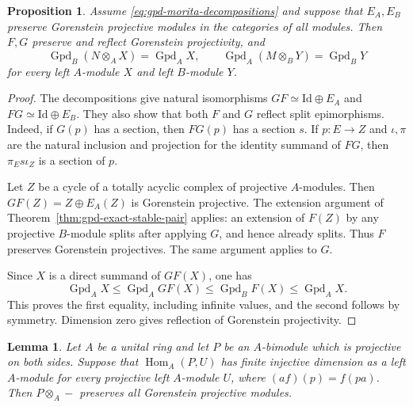 \documentclass[12pt,a4paper,english,reqno]{amsart}
\numberwithin{equation}{section}
\theoremstyle{plain}
\newtheorem{proposition}[theorem]{Proposition}
\newtheorem{lemma}[theorem]{Lemma}
\theoremstyle{definition}
\begin{document}
\begin{proposition}
\label{prop:gpd-error-functor-criterion}
Assume \eqref{eq:gpd-morita-decompositions} and suppose that $E_A,E_B$
preserve Gorenstein projective modules in the categories of all
modules.  Then $F,G$ preserve and reflect Gorenstein projectivity, and
\begin{equation}
 \operatorname{Gpd}_B(N\otimes_AX)=\operatorname{Gpd}_A X,\qquad
 \operatorname{Gpd}_A(M\otimes_BY)=\operatorname{Gpd}_B Y
 \label{eq:gpd-bimodule-equalities}
\end{equation}
for every left $A$-module $X$ and left $B$-module $Y$.
\end{proposition}

\begin{proof}
The decompositions give natural isomorphisms
$GF\simeq\mathrm{Id}\oplus E_A$ and
$FG\simeq\mathrm{Id}\oplus E_B$.  They also show that both $F$ and $G$
reflect split epimorphisms.  Indeed, if $G(p)$ has a section, then
$FG(p)$ has a section $s$.  If $p:E\to Z$ and $\iota,\pi$ are the
natural inclusion and projection for the identity summand of $FG$,
then $\pi_Es\iota_Z$ is a section of $p$.

Let $Z$ be a cycle of a totally acyclic complex of projective
$A$-modules.  Then $GF(Z)=Z\oplus E_A(Z)$ is Gorenstein projective.
The extension argument of Theorem~\ref{thm:gpd-exact-stable-pair}
applies: an extension of $F(Z)$ by any projective $B$-module splits
after applying $G$, and hence already splits.  Thus $F$ preserves
Gorenstein projectives.  The same argument applies to $G$.

Since $X$ is a direct summand of $GF(X)$, one has
\[
 \operatorname{Gpd}_A X
 \leq\operatorname{Gpd}_A GF(X)
 \leq\operatorname{Gpd}_B F(X)
 \leq\operatorname{Gpd}_A X.
\]
This proves the first equality, including infinite values, and the
second follows by symmetry.  Dimension zero gives reflection of
Gorenstein projectivity.
\end{proof}

\begin{lemma}
\label{lem:gpd-error-target-criterion}
Let $A$ be a unital ring and let $P$ be an $A$-bimodule which is
projective on both sides.  Suppose that
$\operatorname{Hom}_A(P,U)$ has finite injective dimension as a left
$A$-module for every projective left $A$-module $U$, where
$(a f)(p)=f(pa)$.  Then $P\otimes_A-$ preserves all Gorenstein
projective modules.
\end{lemma}
\end{document}
